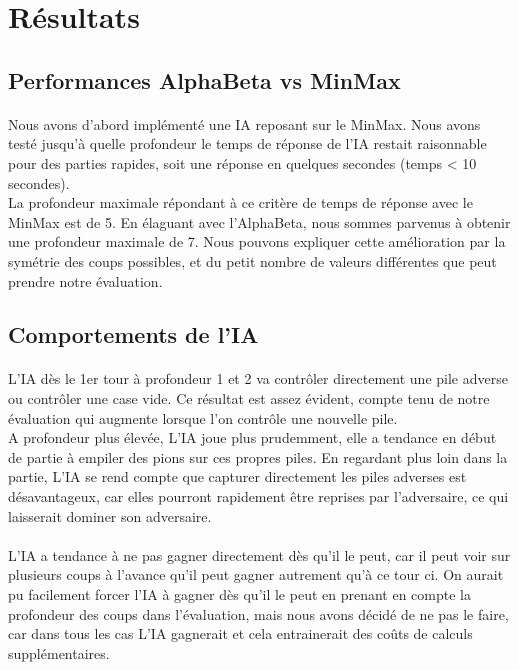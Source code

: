 \documentclass[article, backcover, french, nodocumentinfo]{upmethodology-document}
\begin{document}
	\section{Résultats}
		\subsection{Performances AlphaBeta vs MinMax}
			\paragraph{}
				Nous avons d'abord implémenté une IA reposant sur le MinMax. Nous avons testé jusqu'à quelle profondeur le temps de réponse de l'IA restait raisonnable pour des parties rapides, soit une réponse en quelques secondes (temps < 10 secondes).\\
				La profondeur maximale répondant à ce critère de temps de réponse avec le MinMax est de 5. En élaguant avec l'AlphaBeta, nous sommes parvenus à obtenir une profondeur maximale de 7. Nous pouvons expliquer cette amélioration par la symétrie des coups possibles, et du petit nombre de valeurs différentes que peut prendre notre évaluation.
		\subsection{Comportements de l'IA}
			\paragraph{}
				L'IA dès le 1er tour à profondeur 1 et 2 va contrôler directement une pile adverse ou contrôler une case vide. Ce résultat est assez évident, compte tenu de notre évaluation qui augmente lorsque l'on contrôle une nouvelle pile.\\
				A profondeur plus élevée, L'IA joue plus prudemment, elle a tendance en début de partie à empiler des pions sur ces propres piles. En regardant plus loin dans la partie, L'IA se rend compte que capturer directement les piles adverses est désavantageux, car elles pourront rapidement être reprises par l'adversaire, ce qui laisserait dominer son adversaire.
			\paragraph{}
				L'IA a tendance à ne pas gagner directement dès qu'il le peut, car il peut voir sur plusieurs coups à l'avance qu'il peut gagner autrement qu'à ce tour ci. On aurait pu facilement forcer l'IA à gagner dès qu'il le peut en prenant en compte la profondeur des coups dans l'évaluation, mais nous avons décidé de ne pas le faire, car dans tous les cas L'IA gagnerait et cela entrainerait des coûts de calculs supplémentaires.
\end{document}
